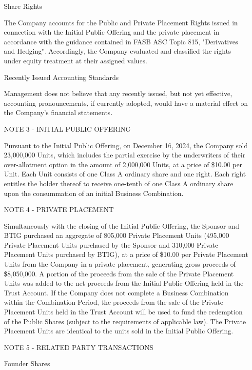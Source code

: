 \documentclass[11pt,a4paper]{article}
\begin{document}
Share Rights

The Company accounts for the Public and Private Placement Rights issued in connection with the Initial Public Offering and the private placement in accordance with the guidance contained in FASB ASC Topic 815, "Derivatives and Hedging". Accordingly, the Company evaluated and classified the rights under equity treatment at their assigned values.

Recently Issued Accounting Standards

Management does not believe that any recently issued, but not yet effective, accounting pronouncements, if currently adopted, would have a material effect on the Company's financial statements.

NOTE 3 - INITIAL PUBLIC OFFERING

Pursuant to the Initial Public Offering, on December 16, 2024, the Company sold 23,000,000 Units, which includes the partial exercise by the underwriters of their over-allotment option in the amount of 2,000,000 Units, at a price of \$10.00 per Unit. Each Unit consists of one Class A ordinary share and one right. Each right entitles the holder thereof to receive one-tenth of one Class A ordinary share upon the consummation of an initial Business Combination.

NOTE 4 - PRIVATE PLACEMENT

Simultaneously with the closing of the Initial Public Offering, the Sponsor and BTIG purchased an aggregate of 805,000 Private Placement Units (495,000 Private Placement Units purchased by the Sponsor and 310,000 Private Placement Units purchased by BTIG), at a price of \$10.00 per Private Placement Units from the Company in a private placement, generating gross proceeds of \$8,050,000. A portion of the proceeds from the sale of the Private Placement Units was added to the net proceeds from the Initial Public Offering held in the Trust Account. If the Company does not complete a Business Combination within the Combination Period, the proceeds from the sale of the Private Placement Units held in the Trust Account will be used to fund the redemption of the Public Shares (subject to the requirements of applicable law). The Private Placement Units are identical to the units sold in the Initial Public Offering.

NOTE 5 - RELATED PARTY TRANSACTIONS

Founder Shares
\end{document}
